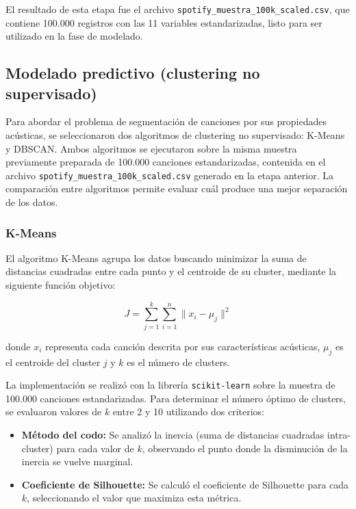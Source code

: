 El resultado de esta etapa fue el archivo \texttt{spotify\_muestra\_100k\_scaled.csv}, que contiene 100.000 registros con las 11 variables estandarizadas, listo para ser utilizado en la fase de modelado.

\subsection{Modelado predictivo (clustering no supervisado)}

Para abordar el problema de segmentación de canciones por sus propiedades acústicas, se seleccionaron dos algoritmos de clustering no supervisado: K-Means y DBSCAN. Ambos algoritmos se ejecutaron sobre la misma muestra previamente preparada de 100.000 canciones estandarizadas, contenida en el archivo \texttt{spotify\_muestra\_100k\_scaled.csv} generado en la etapa anterior. La comparación entre algoritmos permite evaluar cuál produce una mejor separación de los datos.

\subsubsection{K-Means}

El algoritmo K-Means agrupa los datos buscando minimizar la suma de distancias cuadradas entre cada punto y el centroide de su cluster, mediante la siguiente función objetivo:

\begin{equation}
J = \sum_{j=1}^{k} \sum_{i=1}^{n} \|x_i - \mu_j\|^2
\end{equation}

donde \(x_i\) representa cada canción descrita por sus características acústicas, \(\mu_j\) es el centroide del cluster \(j\) y \(k\) es el número de clusters.

La implementación se realizó con la librería \texttt{scikit-learn} sobre la muestra de 100.000 canciones estandarizadas. Para determinar el número óptimo de clusters, se evaluaron valores de \(k\) entre 2 y 10 utilizando dos criterios:

\begin{itemize}
    \item \textbf{Método del codo:} Se analizó la inercia (suma de distancias cuadradas intra-cluster) para cada valor de \(k\), observando el punto donde la disminución de la inercia se vuelve marginal.
    \item \textbf{Coeficiente de Silhouette:} Se calculó el coeficiente de Silhouette para cada \(k\), seleccionando el valor que maximiza esta métrica.
\end{itemize}

